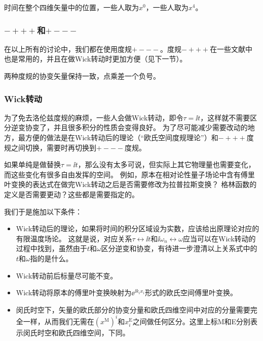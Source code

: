 时间在整个四维矢量中的位置，一些人取为$x^0$，一些人取为$x^4$。

\subsubsection{$-+++$和$+---$}

在以上所有的讨论中，我们都在使用度规$+---$。度规$-+++$在一些文献中也是常用的，并且在做Wick转动时更加方便（见下一节）。

两种度规的协变矢量保持一致，点乘差一个负号。

\subsubsection{Wick转动}

为了免去洛伦兹度规的麻烦，一些人会做Wick转动，即令$\tau=\ii t$，这样就不需要区分逆变协变了，并且很多积分的性质会变得良好。
为了尽可能减少需要改动的地方，最方便的做法是在Wick转动后的理论（“欧氏空间度规理论”）和$-+++$度规之间切换，需要时再切换到$+---$度规。

如果单纯是做替换$\tau = \ii t$，那么没有太多可说，但实际上其它物理量也需要变化，而这些变化有很多自由发挥的空间。
例如，原本在相对论性量子场论中含有傅里叶变换的表达式在做完Wick转动之后是否需要修改为拉普拉斯变换？
格林函数的定义是否需要更动？这些都是需要指定的。

我们于是施加以下条件：
\begin{itemize}
    \item Wick转动后的理论，如果将时间的积分区域设为实数，应该给出原理论对应的有限温度场论。
    这就是说，对应关系$\tau \leftrightarrow \ii t$和$\ii \omega_n \leftrightarrow \omega$应当可以在Wick转动的过程中找到，虽然由于$t$和$\omega$区分逆变和协变，有待进一步澄清以上关系式中的$t$和$\omega$指的是什么。
    \item Wick转动前后标量尽可能不变。
    \item Wick转动将原本的傅里叶变换映射为$\ee^{\ii k_i x_i}$形式的欧氏空间傅里叶变换。
    \item 闵氏时空下，矢量的欧氏部分的协变分量和欧氏四维空间中对应的分量需要完全一样，从而我们无需在$(x^\text{M})^i$和$x^\text{E}_i$之间做任何区分。这里上标M和E分别表示闵氏时空和欧氏四维空间，下同。
\end{itemize}

